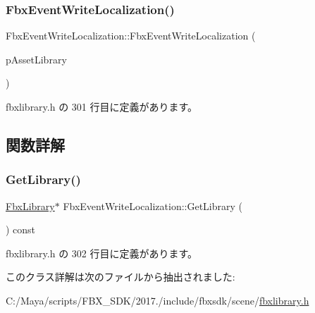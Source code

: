 \subsubsection{\texorpdfstring{Fbx\+Event\+Write\+Localization()}{FbxEventWriteLocalization()}}
{\footnotesize\ttfamily Fbx\+Event\+Write\+Localization\+::\+Fbx\+Event\+Write\+Localization (\begin{DoxyParamCaption}\item[{\hyperlink{class_fbx_library}{Fbx\+Library} $\ast$}]{p\+Asset\+Library }\end{DoxyParamCaption})\hspace{0.3cm}{\ttfamily [inline]}}



 fbxlibrary.\+h の 301 行目に定義があります。



\subsection{関数詳解}
\mbox{\label{class_fbx_event_write_localization_a10110bc0d52be7ba742c5c83c917c40c}} 
\subsubsection{\texorpdfstring{Get\+Library()}{GetLibrary()}}
{\footnotesize\ttfamily \hyperlink{class_fbx_library}{Fbx\+Library}$\ast$ Fbx\+Event\+Write\+Localization\+::\+Get\+Library (\begin{DoxyParamCaption}{ }\end{DoxyParamCaption}) const\hspace{0.3cm}{\ttfamily [inline]}}



 fbxlibrary.\+h の 302 行目に定義があります。



このクラス詳解は次のファイルから抽出されました\+:\begin{DoxyCompactItemize}
\item 
C\+:/\+Maya/scripts/\+F\+B\+X\+\_\+\+S\+D\+K/2017./include/fbxsdk/scene/\hyperlink{fbxlibrary_8h}{fbxlibrary.\+h}\end{DoxyCompactItemize}
